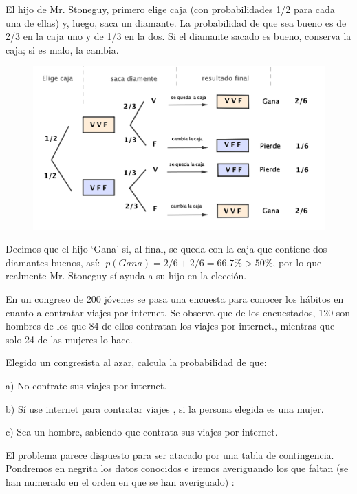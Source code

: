 El hijo de Mr. Stoneguy, primero elige caja (con probabilidades 1/2 para cada una de ellas) y, luego, saca un diamante. La probabilidad de que sea bueno es de 2/3 en la caja uno y de 1/3 en la dos. Si el diamante sacado es bueno, conserva la caja; si es malo, la cambia.

	\begin{figure}[H]
				\centering
			\includegraphics[width=.85\textwidth]{imagenes/imagenes02/T02IM35.png}
	\end{figure}

Decimos que el hijo `Gana' si, al final, se queda con la caja que contiene dos diamantes buenos, así:
$\ p(Gana)=2/6+2/6=66.7\%>50\%$, por lo que realmente Mr. Stoneguy sí ayuda a su hijo en la elección.

\vspace{5mm}
\begin{ejemplo}
\begin{ejer}
En un congreso de 200 jóvenes se pasa una encuesta para conocer los hábitos en cuanto a contratar viajes por internet. Se observa que de los encuestados, 120 son hombres de los que 84 de ellos contratan los viajes por internet., mientras que solo 24 de las mujeres lo hace.

Elegido un congresista al azar, calcula la probabilidad de que:

a) No contrate sus viajes por internet.

b) Sí use internet para contratar viajes , si la persona elegida es una mujer.

c) Sea un hombre, sabiendo que contrata sus viajes por internet.
\end{ejer}

\end{ejemplo}
El problema parece dispuesto para ser atacado por una tabla de contingencia. Pondremos en negrita los datos conocidos e iremos averiguando los que faltan (se han numerado en el orden en que se han averiguado) :

